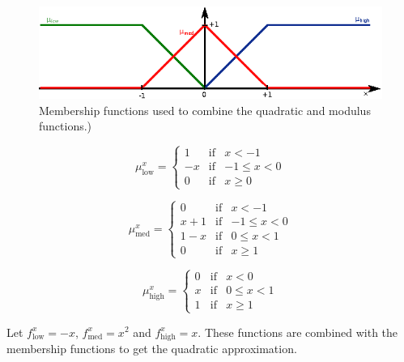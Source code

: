 \begin{figure}[h!]
	\centering
	\includegraphics[width=0.7\linewidth]{modulus/images/fuzzy}
	\caption{Membership functions used to combine the quadratic and modulus functions.)}
	\label{fig:fuzzy}
\end{figure}

\begin{equation}
\label{eq:mulow}
\mu^x_{\text{low}}= \left\{ \begin{array}{lcc}
1 &   \text{if}  & x < -1 \\
-x & \text{if}  & -1 \leq x < 0 \\
0 &  \text{if} & x \geq 0
\end{array}
\right.
\end{equation}

\begin{equation}
\label{eq:mumid}
\mu^x_{\text{med}}= \left\{ \begin{array}{lcc}
0 &   \text{if}  & x < -1 \\
x+1 & \text{if}  & -1 \leq x < 0 \\
1-x & \text{if}  & 0 \leq x < 1 \\
0 &  \text{if} & x \geq 1
\end{array}
\right.
\end{equation}

\begin{equation}
\label{eq:muhigh}
\mu^x_{\text{high}}= \left\{ \begin{array}{lcc}
0 &   \text{if}  & x < 0 \\
x & \text{if}  & 0 \leq x < 1 \\
1 &  \text{if} & x \geq 1
\end{array}
\right.
\end{equation}

Let $f^x_{\text{low}}=-x$, $f^x_{\text{med}}=x^2$ and $f^x_{\text{high}}=x$. These functions are combined with the membership functions to get the quadratic approximation.

